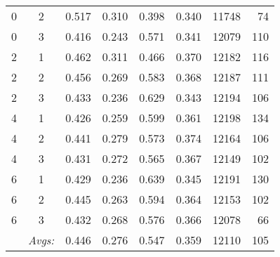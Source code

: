 \begin{enumerate}
{{\begin{table}
{\begin{tabular}{cc|ccccrr}
0 & 2 & 0.517 & 0.310 & 0.398 & 0.340 & 11748 & 74 \\
0 & 3 & 0.416 & 0.243 & 0.571 & 0.341 & 12079 & 110 \\ \hline %
2 & 1 & 0.462 & 0.311 & 0.466 & 0.370 & 12182 & 116 \\
2 & 2 & 0.456 & 0.269 & 0.583 & 0.368 & 12187 & 111 \\%
2 & 3 & 0.433 & 0.236 & 0.629 & 0.343 & 12194 & 106 \\ \hline %
4 & 1 & 0.426 & 0.259 & 0.599 & 0.361 & 12198 & 134 \\  %
4 & 2 & 0.441 & 0.279 & 0.573 & 0.374 & 12164 & 106 \\
4 & 3 & 0.431 & 0.272 & 0.565 & 0.367 & 12149 & 102 \\ \hline %
6 & 1 & 0.429 & 0.236 & 0.639 & 0.345 & 12191 & 130 \\  %
6 & 2 & 0.445 & 0.263 & 0.594 & 0.364 & 12153 & 102 \\
6 & 3 & 0.432 & 0.268 & 0.576 & 0.366 & 12078 & 66 \\ \hline \hline %
 & \textit{Avgs:} & 0.446 & 0.276 & 0.547 & 0.359 & 12110 & 105 \\
\end{tabular}
}
\end{table}}}
\end{enumerate}
